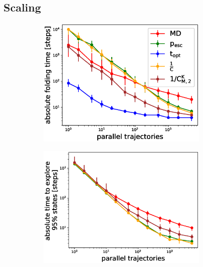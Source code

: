 \subsection{\label{sec:scaling}Scaling}

\begin{figure}[H]
  \begin{subfigure}[t]{0.5\textwidth}
    \includegraphics[width=0.9\textwidth]{figures/GTT_6_steps10000_scaling_fold0.eps}    
  \end{subfigure}
  \begin{subfigure}[t]{0.5\textwidth}
    \includegraphics[width=0.9\textwidth]{figures/1FME_6_steps10000_scaling_explore.eps}
  \end{subfigure}
  \begin{subfigure}[t]{0.5\textwidth}

\end{subfigure}
\end{figure}
